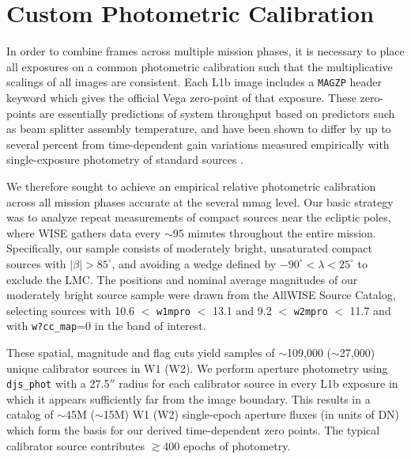\documentclass{emulateapj}
\begin{document}

\section{Custom Photometric Calibration}
\label{sec:calib}
In order to combine frames across multiple mission phases, it is necessary
to place all exposures on a common photometric calibration such that
the multiplicative scalings of all images are consistent. Each L1b
image includes a \verb|MAGZP| header keyword which gives the official
Vega zero-point of that exposure. These zero-points are essentially
predictions of system throughput based on predictors such as beam splitter
assembly temperature, and have been shown to differ by up to several percent 
from time-dependent gain variations measured empirically with single-exposure
photometry of standard sources \citep{cutri13, cutri15}.

We therefore sought to achieve an empirical relative photometric calibration
across all mission phases accurate at the several mmag level. Our basic
strategy was to analyze repeat measurements of compact sources near the 
ecliptic poles, where WISE gathers data every $\sim$$95$ minutes throughout the 
entire mission. Specifically, our sample consists of moderately bright,
unsaturated compact sources with $|\beta| > 85^{\circ}$, and avoiding a wedge 
defined by $-90^{\circ}$$<$$\lambda$$<25^{\circ}$ to exclude the LMC. The 
positions and nominal average magnitudes of our moderately bright source
sample were drawn from the AllWISE Source Catalog, selecting sources with 
10.6 $<$ \verb|w1mpro| $<$ 13.1 and 9.2 $<$ \verb|w2mpro| $<$ 11.7 and with
\verb|w?cc_map|=0 in the band of interest.

These spatial, magnitude and flag cuts yield samples of $\sim$109,000 
($\sim$27,000) unique calibrator sources in W1 (W2). We perform aperture 
photometry using \verb|djs_phot| with a 27.5$''$ radius for each calibrator 
source in every L1b exposure in which it appears sufficiently far from the 
image boundary. This results in a catalog of $\sim$45M ($\sim$15M) W1 (W2) 
single-epoch aperture fluxes (in units of DN) which form the basis for our 
derived time-dependent zero points. The typical calibrator source contributes 
$\gtrsim$400 epochs of photometry.
\end{document}
